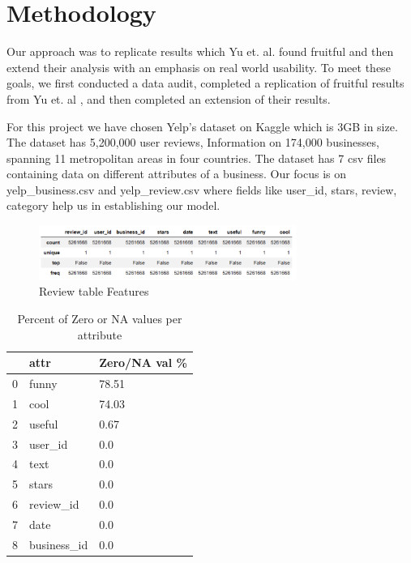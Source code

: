 \documentclass[12pt]{article}
\begin{document}
\section{Methodology}

Our approach was to replicate results which Yu et. al. \cite{yu2015restaurants} found
fruitful and then extend their analysis with an emphasis on real world usability. To meet
these goals, we first conducted a data audit, completed a replication of fruitful results
from Yu et. al \cite{yu2015restaurants}, and then completed an extension of their results.

For this project we have chosen Yelp’s dataset on Kaggle \cite{YelpData59:online}
which is 3GB in size. The dataset has 5,200,000 user reviews, Information on 174,000 businesses,
spanning 11 metropolitan areas in four countries. The dataset has 7 csv files containing data on
different attributes of a business. Our focus is on yelp\_business.csv and yelp\_review.csv where
fields like user\_id, stars, review, category help us in establishing our model.

\begin{figure}[h]
  \caption{Review table Features}
  \centering
  \includegraphics[width=0.75\textwidth]{review_table}
  \end{figure}
  
  \begin{table}[h]
	\caption{Percent of Zero or NA values per attribute}
	\centering
	\begin{tabular}{|l|l|l|}
	\hline
    \textbf{} & \textbf{attr} & \textbf{Zero/NA val \%} \\
	\hline 
	0         & funny     & 78.51    \\
	\hline 
	1         & cool      & 74.03  \\
 	\hline 
 	2 & useful      & 0.67    \\
 	\hline
 	3 & user_id      & 0.0   \\
 	\hline
 	4 & text      & 0.0    \\
 	\hline
 	5 & stars      & 0.0   \\
 	\hline
 	6 & review_id      & 0.0   \\
 	\hline
 	7 & date      & 0.0   \\
 	\hline
 	8 & business_id      & 0.0  \\
 	\hline
\end{tabular}
\end{table}
  
\end{document}
